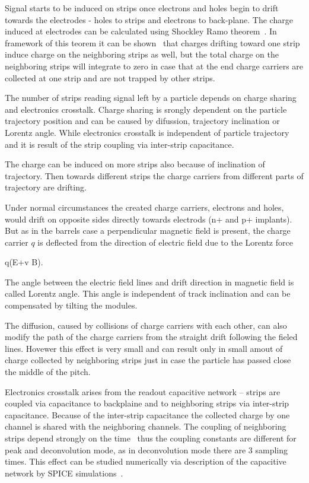 Signal starts to be induced on strips once electrons and holes begin to drift towards the electrodes - holes to strips and electrons to back-plane. The charge induced at electrodes can be calculated using Shockley Ramo theorem~\cite{doi:10.1063/1.1710367,Ramo:1939vr}. In framework of this teorem it can be shown~\cite{Bloch:2007zza} that charges drifting toward one strip induce charge on the neighboring strips as well, but the total charge on the neighboring strips will integrate to zero in case that at the end charge carriers are collected at one strip and are not trapped by other strips.

The number of strips reading signal left by a particle depends on charge sharing and electronics crosstalk. Charge sharing is srongly dependent on the particle trajectory position and can be caused by difussion, trajectory inclination or Lorentz angle. While electronics crosstalk is independent of particle trajectory and it is result of the strip coupling via inter-strip capacitance. 

The charge can be induced on more strips also because of inclination of trajectory. Then towards different strips the charge carriers from different parts of trajectory are drifting.

Under normal circumstances the created charge carriers, electrons and holes, would drift on opposite sides directly towards electrods (n+ and p+ implants). But as in the barrels case a perpendicular magnetic field is present, the charge carrier $q$ is deflected from the direction of electric field due to the Lorentz force

{
    q(E+v \times B).
}

The angle between the electric field lines and drift direction in magnetic field is called Lorentz angle. This angle is independent of track inclination and can be compensated by tilting the modules.

The diffusion, caused by collisions of charge carriers with each other, can also modify the path of the charge carriers from the straight drift following the fieled lines. Hovewer this effect is very small and can result only in small amout of charge collected by neighboring strips just in case the particle has passed close the middle of the pitch.


Electronics crosstalk arises from the readout capacitive network -- strips are coupled via capacitance to backplaine and to neighboring strips via inter-strip capacitance. Because of the inter-strip capacitance the collected charge by one channel is shared with the neighboring channels. The coupling of neighboring strips depend strongly on the time~\cite{Bloch:2007zza} thus the coupling constants are different for peak and deconvolution mode, as in deconvolution mode there are 3 sampling times. This effect can be studied numerically via description of the capacitive network by SPICE simulations~\cite{Barberis:1993ph}.



